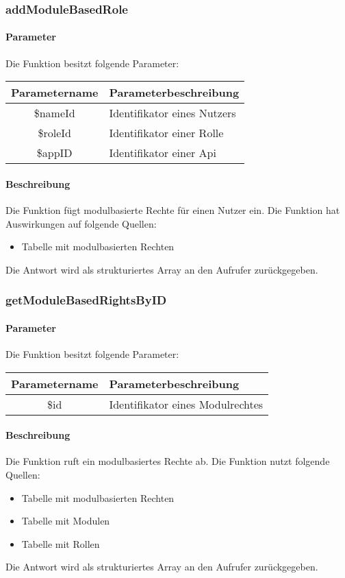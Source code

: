 \subsubsection{addModuleBasedRole}
\paragraph{Parameter} Die Funktion besitzt folgende Parameter:
\begin{table}[H]
	\begin{tabular}{|c|p{11cm}|}
		\hline
		\textbf{Parametername} & \textbf{Parameterbeschreibung} \\ \hline
		\$nameId & Identifikator eines Nutzers \\ \hline
		\$roleId & Identifikator einer Rolle \\ \hline
		\$appID  & Identifikator einer Api \\ \hline
	\end{tabular}
\end{table}
\paragraph{Beschreibung} Die Funktion fügt modulbasierte Rechte für einen Nutzer ein. Die Funktion hat Auswirkungen auf folgende Quellen:
\begin{itemize}
	\item Tabelle mit modulbasierten Rechten
\end{itemize}
Die Antwort wird als strukturiertes Array an den Aufrufer zurückgegeben.
\subsubsection{getModuleBasedRightsByID}
\paragraph{Parameter} Die Funktion besitzt folgende Parameter:
\begin{table}[H]
	\begin{tabular}{|c|p{11cm}|}
		\hline
		\textbf{Parametername} & \textbf{Parameterbeschreibung} \\ \hline
		\$id & Identifikator eines Modulrechtes \\ \hline
	\end{tabular}
\end{table}
\paragraph{Beschreibung} Die Funktion ruft ein modulbasiertes Rechte ab. Die Funktion nutzt folgende Quellen:
\begin{itemize}
	\item Tabelle mit modulbasierten Rechten
	\item Tabelle mit Modulen
	\item Tabelle mit Rollen
\end{itemize}
Die Antwort wird als strukturiertes Array an den Aufrufer zurückgegeben.
